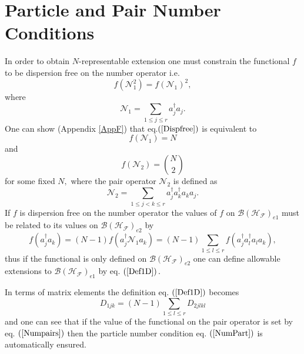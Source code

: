 \documentclass[aps,preprint]{revtex4}%
\begin{document}
\section{Particle and Pair Number Conditions \label{PartPair}}

In order to obtain $N$-representable extension one must constrain the
functional $f$ to be dispersion free on the number operator i.e.
\begin{equation}
f\left(  \mathcal{N}_{1}^{2}\right)  =f\left(  \mathcal{N}_{1}\right)  ^{2},
\label{Dispfree}%
\end{equation}
where
\begin{equation}
\mathcal{N}_{1}=\sum_{1\leq j\leq r}a_{j}^{\dagger}a_{j}.
\end{equation}
One can show (Appendix \ref{AppF}) that eq.$\left(  \ref{Dispfree}\right)  $
is equivalent to
\begin{equation}
f\left(  \mathcal{N}_{1}\right)  =N \label{NumPart}%
\end{equation}
and
\begin{equation}
f\left(  \mathcal{N}_{2}\right)  =\binom{N}{2} \label{Numpairs}%
\end{equation}
for some fixed $N,$ where the pair operator $\mathcal{N}_{2}$ is defined as
\begin{equation}
\mathcal{N}_{2}=\sum_{1\leq j<k\leq r}a_{j}^{\dagger}a_{k}^{\dagger}a_{k}%
a_{j}.
\end{equation}
If $f$ is dispersion free on the number operator the values of $f$ on
$\mathcal{B}\left(  \mathcal{H}_{\mathcal{F}}\right)  _{e1}$ must be related
to its values on $\mathcal{B}\left(  \mathcal{H}_{\mathcal{F}}\right)  _{e2}$
by
\begin{equation}
f\left(  a_{j}^{\dagger}a_{k}\right)  =\left(  N-1\right)  f\left(
a_{j}^{\dagger}\mathcal{N}_{1}a_{k}\right)  =\left(  N-1\right)  \sum_{1\leq
l\leq r}f\left(  a_{j}^{\dagger}a_{l}^{\dagger}a_{l}a_{k}\right)  ,
\label{Def1D}%
\end{equation}
thus if the functional is only defined on $\mathcal{B}\left(  \mathcal{H}%
_{\mathcal{F}}\right)  _{e2}$ one can define allowable extensions to
$\mathcal{B}\left(  \mathcal{H}_{\mathcal{F}}\right)  _{e1}$ by eq. $\left(
\ref{Def1D}\right)  .$

In terms of matrix elements the definition eq. $\left(  \ref{Def1D}\right)  $
becomes
\begin{equation}
D_{1jk}=\left(  N-1\right)  \sum_{1\leq l\leq r}D_{2jlkl}%
\end{equation}
and one can see that if the value of the functional on the pair operator is
set by eq. $\left(  \ref{Numpairs}\right)  $ then the particle number
condition eq. $\left(  \ref{NumPart}\right)  $ is automatically ensured.
\end{document}
